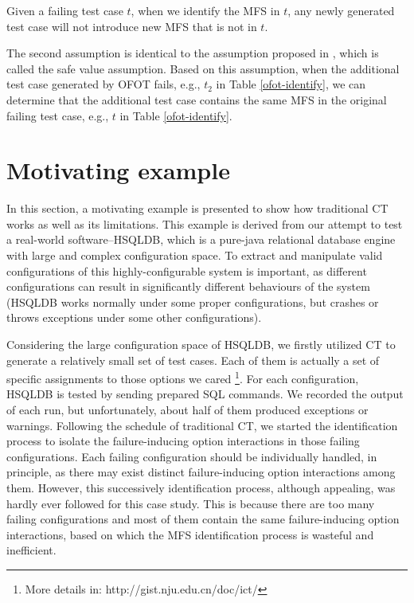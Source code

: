 \documentclass[10pt,journal,compsoc]{IEEEtran}
\begin{document}
\begin{assumption}
Given a failing test case $t$, when we identify the MFS in $t$, any newly generated test case will not introduce new MFS that is not in $t$.
\end{assumption}

The second assumption is identical to the assumption proposed in \cite{zhang2011characterizing,martinez2008algorithms,martinez2009locating}, which is called the safe value assumption. Based on this assumption, when the additional test case generated by OFOT fails, e.g., $t_{2}$ in Table \ref{ofot-identify}, we can determine that the additional test case contains the same MFS in the original failing test case, e.g., $t$ in Table \ref{ofot-identify}.

\section{Motivating example}\label{sec:moti}
In this section, a motivating example is presented to show how traditional CT works as well as its limitations. This example is derived from our attempt to test a real-world software--HSQLDB, which is a pure-java relational database engine with large and complex configuration space. To extract and manipulate valid configurations of this highly-configurable system is important, as different configurations can result in significantly different behaviours of the system \cite{jin2014configurations,qu2008configuration,song2012itree} (HSQLDB works normally under some proper configurations, but crashes or throws exceptions under some other configurations).

Considering the large configuration space of HSQLDB, we firstly utilized CT to generate a relatively small set of test cases. Each of them is actually a set of specific assignments to those options we cared  \footnote{More details in: http://gist.nju.edu.cn/doc/ict/}. For each configuration, HSQLDB is tested by sending prepared SQL commands. We recorded the output of each run, but unfortunately, about half of them produced exceptions or warnings. Following the schedule of traditional CT, we started the identification process to isolate the failure-inducing option interactions in those failing configurations. Each failing configuration should be individually handled, in principle, as there may exist distinct failure-inducing option interactions among them. However, this successively identification process, although appealing, was hardly ever followed for this case study. This is because there are too many failing configurations and most of them contain the same failure-inducing option interactions, based on which the MFS identification process is wasteful and inefficient.
\end{document}
